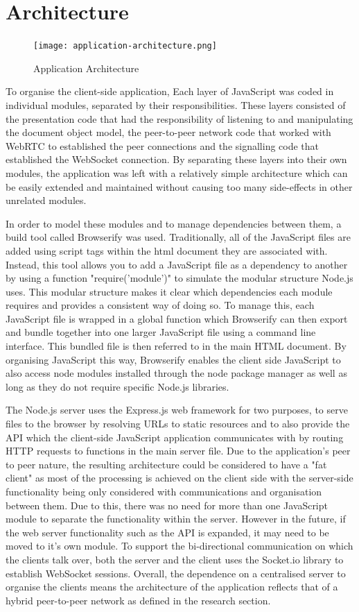 \documentclass[]{report}
\begin{document}
		\section{Architecture}
			\begin{figure}[H]
				\caption{Application Architecture}
				\centering
				\texttt{[image: application-architecture.png]}
			\end{figure}
			To organise the client-side application, Each layer of JavaScript was coded in individual modules, separated by their responsibilities. These layers consisted of the presentation code that had the responsibility of listening to and manipulating the document object model, the peer-to-peer network code that worked with WebRTC to established the peer connections and the signalling code that established the WebSocket connection. By separating these layers into their own modules, the application was left with a relatively simple architecture which can be easily extended and maintained without causing too many side-effects in other unrelated modules.
			
			In order to model these modules and to manage dependencies between them, a build tool called Browserify was used. Traditionally, all of the JavaScript files are added using script tags within the html document they are associated with. Instead, this tool allows you to add a JavaScript file as a dependency to another by using a function "require('module')" to simulate the modular structure Node.js uses. This modular structure makes it clear which dependencies each module requires and provides a consistent way of doing so. To manage this, each JavaScript file is wrapped in a global function which Browserify can then export and bundle together into one larger JavaScript file using a command line interface. This bundled file is then referred to in the main HTML document. By organising JavaScript this way, Browserify enables the client side JavaScript to also access node modules installed through the node package manager as well as long as they do not require specific Node.js libraries.
			
			The Node.js server uses the Express.js web framework for two purposes, to serve files to the browser by resolving URLs to static resources and to also provide the API which the client-side JavaScript application communicates with by routing HTTP requests to functions in the main server file. Due to the application's peer to peer nature, the resulting architecture could be considered to have a "fat client" as most of the processing is achieved on the client side with the server-side functionality being only considered with communications and organisation between them. Due to this, there was no need for more than one JavaScript module to separate the functionality within the server. However in the future, if the web server functionality such as the API is expanded, it may need to be moved to it's own module. To support the bi-directional communication on which the clients talk over, both the server and the client uses the Socket.io library to establish WebSocket sessions. Overall, the dependence on a centralised server to organise the clients means the architecture of the application reflects that of a hybrid peer-to-peer network as defined in the research section.
			
\end{document}
